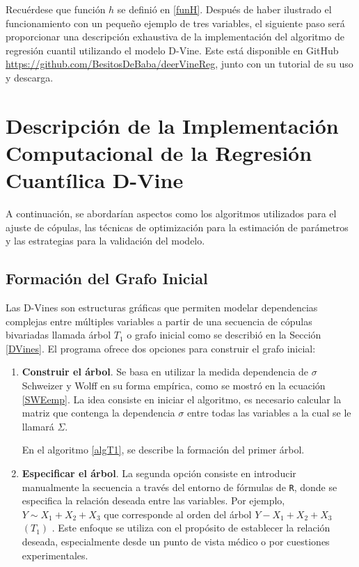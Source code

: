 Recuérdese que función $h$ se definió en \eqref{funH}. Después de haber ilustrado el funcionamiento con un pequeño ejemplo de tres variables, el siguiente paso será proporcionar una descripción exhaustiva de la implementación del algoritmo de regresión cuantil utilizando el modelo D-Vine. Este está disponible en GitHub \url{https://github.com/BesitosDeBaba/deerVineReg}, junto con un tutorial de su uso y descarga.

\section{Descripción de la Implementación Computacional de la Regresión Cuantílica D-Vine}

A continuación, se abordarían aspectos como los algoritmos utilizados para el ajuste de cópulas, las técnicas de optimización para la estimación de parámetros y las estrategias para la validación del modelo. 

\subsection{Formación del Grafo Inicial}

Las D-Vines son estructuras gráficas que permiten modelar dependencias complejas entre múltiples variables a partir de una secuencia de cópulas bivariadas llamada árbol $T_1$ o grafo inicial como se describió en la Sección \ref{DVines}. El programa ofrece dos opciones para construir el grafo inicial:

\begin{enumerate}
    \item \textbf{Construir el árbol}. Se basa en utilizar la medida dependencia de $\sigma$ Schweizer y Wolff en su forma empírica, como se mostró en la ecuación \eqref{SWEemp}. La idea consiste en iniciar el algoritmo, es necesario calcular la matriz que contenga la dependencia $\sigma$ entre todas las variables a la cual se le llamará $\Sigma$.

    En el algoritmo \ref{algT1}, se describe la formación del primer árbol.

    \item \textbf{Especificar el árbol}. La segunda opción consiste en introducir manualmente la secuencia a través del entorno de fórmulas de \texttt{R}, donde se especifica la relación deseada entre las variables. Por ejemplo, $Y \sim X_1 + X_2 + X_3$ que corresponde al orden del árbol $Y - X_1 + X_2 + X_3$ $(T_1)$ . Este enfoque se utiliza con el propósito de establecer la relación deseada, especialmente desde un punto de vista médico o  por cuestiones experimentales.
\end{enumerate}

